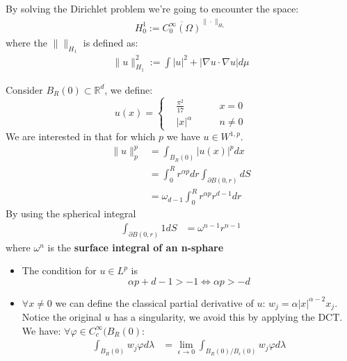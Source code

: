 \begin{example}
By solving the Dirichlet problem we're going to encounter the space:
\begin{align*}
	H^1_0:= \overline{ C_0^\infty(\Omega)}^{\|\cdot\|_{H_1}}
\end{align*}
where the $\|\|_{H_1}$ is defined as:
\begin{align*}
	\|u\|_{H_1}^2 := \int |u|^2 + |\nabla u \cdot \nabla u|  d\mu
\end{align*}
\end{example}

\begin{example}
Consider $B_R(0) \subset \mathbb{R}^d$, we define:
\begin{equation*}
u(x) = \left\{ 
	\begin{aligned}
		&\frac{\pi^2}{17} \quad &x = 0\\
		&|x|^\alpha \quad \quad &n \neq 0
	\end{aligned}
	\right.
\end{equation*}	
We are interested in that for which $p$ we have $u \in W^{1, p}$. 
\begin{align*}
	\|u\|_p^p &= \int_{B_R(0)} |u(x)|^p dx \\
	&= \int_0^R r^{\alpha p} dr \int_{\partial B(0, r)} dS  \\
	&= \omega_{d-1} \int_0^R r^{\alpha p} r^{d-1}dr
\end{align*}
By using the spherical integral
\begin{equation}
\begin{aligned}
	\int_{\partial B(0, r)} 1 dS &= \omega^{n-1} r^{n-1}
\end{aligned}
\end{equation}
where $\omega^n$ is the \textbf{surface integral of an n-sphare}
\begin{itemize}
	\item The condition for $u \in L^p$ is 
\begin{equation*}
	\alpha p + d-1 > -1 \Leftrightarrow \alpha p > -d
\end{equation*}
	\item $\forall x \neq 0$ we can define the classical partial derivative of $u$: $w_j = \alpha |x|^{\alpha - 2} x_j$. Notice the original $u$ has a singularity, we avoid this by applying the DCT. We have: $\forall \varphi \in C_c^\infty(B_R(0)$:
	\begin{align*}
		\int_{B_R(0)} w_j \varphi d\lambda &= \lim_{\epsilon \rightarrow 0} \int_{B_R(0)\slash B_\epsilon (0)} w_j \varphi d\lambda \\

\end{align*}
\end{itemize}
\end{example}
